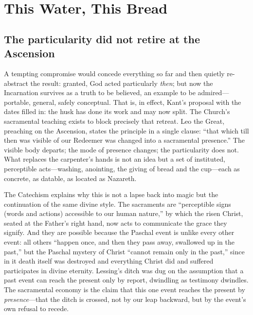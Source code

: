 \section{This Water, This Bread}

\subsection{The particularity did not retire at the Ascension}

A tempting compromise would concede everything so far and then quietly re-abstract the result: granted, God acted particularly \emph{then}; but now the Incarnation survives as a truth to be believed, an example to be admired---portable, general, safely conceptual. That is, in effect, Kant's proposal with the dates filled in: the husk has done its work and may now split. The Church's sacramental teaching exists to block precisely that retreat. Leo the Great, preaching on the Ascension, states the principle in a single clause: ``that which till then was visible of our Redeemer was changed into a sacramental presence.'' The visible body departs; the mode of presence changes; the particularity does not. What replaces the carpenter's hands is not an idea but a set of instituted, perceptible acts---washing, anointing, the giving of bread and the cup---each as concrete, as datable, as located as Nazareth.

The Catechism explains why this is not a lapse back into magic but the continuation of the same divine style. The sacraments are ``perceptible signs (words and actions) accessible to our human nature,'' by which the risen Christ, seated at the Father's right hand, now acts to communicate the grace they signify. And they are possible because the Paschal event is unlike every other event: all others ``happen once, and then they pass away, swallowed up in the past,'' but the Paschal mystery of Christ ``cannot remain only in the past,'' since in it death itself was destroyed and everything Christ did and suffered participates in divine eternity. Lessing's ditch was dug on the assumption that a past event can reach the present only by report, dwindling as testimony dwindles. The sacramental economy is the claim that this one event reaches the present by \emph{presence}---that the ditch is crossed, not by our leap backward, but by the event's own refusal to recede.

